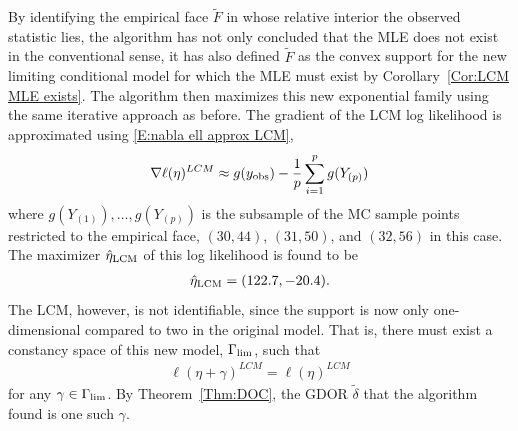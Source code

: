 By identifying the empirical face $\tilde{F}$ in whose relative interior the observed 
statistic lies, 
the algorithm has not only concluded that the MLE does not exist in the conventional 
sense, it has also defined $\tilde{F}$ as the convex support for the new limiting conditional 
model for which the MLE must exist by Corollary~\ref{Cor:LCM MLE exists}.
The algorithm then maximizes this new exponential family using the same 
iterative approach as before.  The gradient of the LCM log likelihood is approximated 
using \eqref{E:nabla ell approx LCM},
\begin{align*}
	\nabla \ell( \eta )^{LCM} \approx g(y_{\text{obs}}) - \frac{1}{p} \sum_{i=1}^p g(Y_{(p)})
\end{align*}
where $g(Y_{(1)}), \ldots, g(Y_{(p)})$ is the subsample of the MC sample points 
restricted to the empirical face, $(30,44)$, $(31,50)$, and $(32,56)$ in this case.  
The maximizer $\hat{\eta}_{\textrm{LCM}}$ of this log likelihood is found to
be
\begin{align*}
\hat{\eta}_{\textrm{LCM}} = (122.7, -20.4).
\end{align*}
The LCM, however, is not identifiable, since the support is now only one-dimensional 
compared to two in the original model.  That is, there must exist a constancy space 
of this new model, $\Gamma_{\textrm{lim}}$, such that 
\begin{align} \label{E:Gammalim}
\ell( \eta + \gamma )^{LCM} = \ell( \eta )^{LCM}
\end{align}
for any $\gamma \in \Gamma_{\textrm{lim}}$.  By Theorem~\ref{Thm:DOC}, the GDOR $\tilde{\delta}$ 
that the algorithm found is one such $\gamma$.

